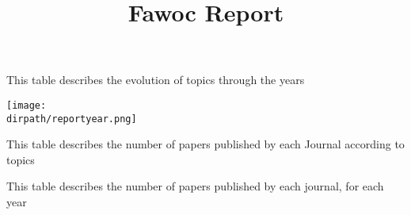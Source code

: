 \documentclass{article}
\newcommand*{\dirpath}{.}%
\begin{document}
	\title{Fawoc Report}
	\maketitle
	\begin{table}[h]
		\centering
		
		\caption{This table describes the evolution of topics through the years}
	\end{table}
	
	
	\texttt{[image: \\dirpath/reportyear.png]}
	

	\begin{table} 
		\centering
		
		\caption{This table describes the number of papers published by each Journal according to topics}
	\end{table}


	\begin{table}
		\centering
		
		\caption{This table describes the number of papers published by each journal, for each year}
	\end{table}
\end{document}
